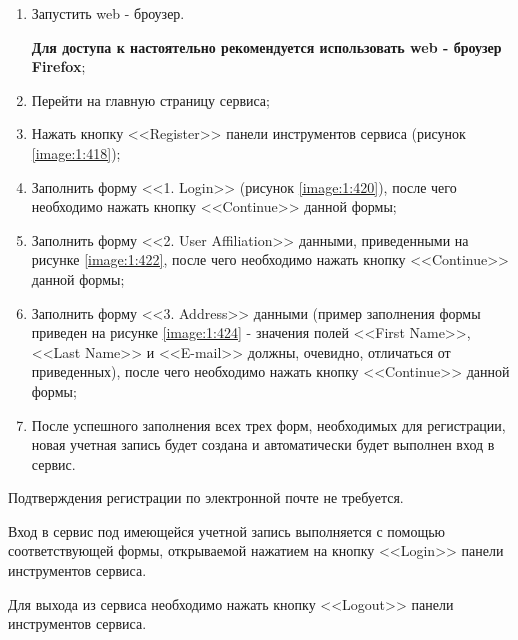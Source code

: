\begin{enumerate}

	\item Запустить web - броузер.

	{\bf Для доступа к \ee настоятельно рекомендуется использовать web - броузер Firefox};

	\item Перейти на главную страницу сервиса;
	\item Нажать кнопку <<Register>> панели инструментов сервиса (рисунок \ref{image:1:418});
	\item Заполнить форму <<1. Login>> (рисунок \ref{image:1:420}), после чего необходимо нажать кнопку \linebreak <<Continue>> данной формы;
	\item Заполнить форму <<2. User Affiliation>> данными, приведенными на рисунке \ref{image:1:422}, после чего необходимо нажать кнопку <<Continue>> данной формы;
	\item Заполнить форму <<3. Address>> данными (пример заполнения формы приведен на рисунке \ref{image:1:424} - значения полей <<First Name>>, <<Last Name>> и <<E-mail>> должны, очевидно, отличаться от приведенных), после чего необходимо нажать кнопку <<Continue>> данной формы;
	\item После успешного заполнения всех трех форм, необходимых для регистрации, новая учетная запись будет создана и автоматически будет выполнен вход в сервис.

\end{enumerate}

Подтверждения регистрации по электронной почте не требуется.

\begin{landscape}
\end{landscape}


Вход в сервис \ee под имеющейся учетной запись выполняется с помощью соответствующей формы, открываемой нажатием на кнопку <<Login>> панели инструментов сервиса.

Для выхода из сервиса необходимо нажать кнопку <<Logout>> панели инструментов сервиса.


